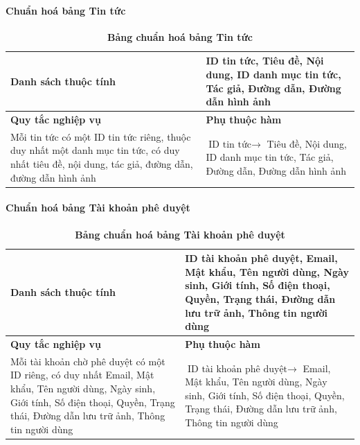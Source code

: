 \paragraph{Chuẩn hoá bảng Tin tức}
\mbox{}
\begin{table}[H]
  \caption{\bfseries \fontsize{12pt}{0pt}\selectfont Bảng chuẩn hoá bảng Tin tức}
  \centering
  \begin{tabularx}{0.9\textwidth}{|X|X|}
    \hline
    \textbf{Danh sách thuộc tính} & ID tin tức, Tiêu đề, Nội dung, ID danh mục tin tức, Tác giả, Đường dẫn,
    Đường dẫn hình ảnh \\
    \hline
    \textbf{Quy tắc nghiệp vụ} & \textbf{Phụ thuộc hàm} \\
    \hline
    Mỗi tin tức có một ID tin tức riêng, thuộc duy nhất một danh mục tin tức, có duy nhất tiêu đề, 
    nội dung, tác giả, đường dẫn, đường dẫn hình ảnh
    & \parbox[t]{\linewidth}{$\text{ID tin tức} \rightarrow$ Tiêu đề, Nội dung, ID danh mục tin tức, Tác giả, 
    Đường dẫn, Đường dẫn hình ảnh} \\
    \hline
     \\
     \\
    \hline
  \end{tabularx}
\end{table}

\paragraph{Chuẩn hoá bảng Tài khoản phê duyệt}
\mbox{}
\begin{table}[H]
  \caption{\bfseries \fontsize{12pt}{0pt}\selectfont Bảng chuẩn hoá bảng Tài khoản phê duyệt}
  \centering
  \begin{tabularx}{0.9\textwidth}{|X|X|}
    \hline
    \textbf{Danh sách thuộc tính} & ID tài khoản phê duyệt, Email, Mật khẩu, Tên người dùng, Ngày sinh, Giới tính, Số điện thoại, Quyền, Trạng thái, Đường dẫn lưu trữ ảnh, Thông tin người dùng \\
    \hline
    \textbf{Quy tắc nghiệp vụ} & \textbf{Phụ thuộc hàm} \\
    \hline
    Mỗi tài khoản chờ phê duyệt có một ID riêng, có duy nhất Email, Mật khẩu, Tên người dùng, Ngày sinh, Giới tính,
     Số điện thoại, Quyền, Trạng thái, Đường dẫn lưu trữ ảnh, Thông tin người dùng 
    & \parbox[t]{\linewidth}{$\text{ID tài khoản phê duyệt} \rightarrow$ Email, Mật khẩu, Tên người dùng, Ngày sinh, Giới tính,
    Số điện thoại, Quyền, Trạng thái, Đường dẫn lưu trữ ảnh, Thông tin người dùng} \\
    \hline
     \\
     \\
    \hline
  \end{tabularx}
\end{table}

